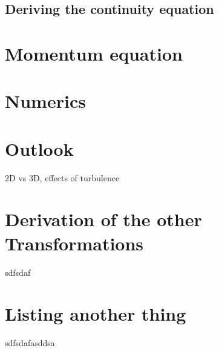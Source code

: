 \documentclass[12pt,a4paper,twoside]{article}
\begin{document}
\subsection{Deriving the continuity equation}
\label{sub:Deriving the continuity equation}

\section{Momentum equation}
\label{sec:Momentum equation}

\section{Numerics}
\label{sec:Numerics}

\section{Outlook}
\label{sec:Outlook}
2D vs 3D, effects of turbulence

\newpage
\begin{appendices}

\section{Derivation of the other Transformations}
sdfsdaf

\section{Listing another thing}
sdfsdafasddsa

\end{appendices}
\end{document}
